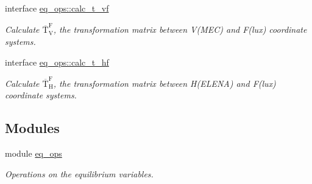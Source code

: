 \begin{DoxyCompactItemize}
interface \hyperlink{interfaceeq__ops_1_1calc__t__vf}{eq\+\_\+ops\+::calc\+\_\+t\+\_\+vf}
\begin{DoxyCompactList}\small\item\em Calculate $\overline{\text{T}}_\text{V}^\text{F}$, the transformation matrix between V(\+M\+E\+C) and F(lux) coordinate systems. \end{DoxyCompactList}\item 
interface \hyperlink{interfaceeq__ops_1_1calc__t__hf}{eq\+\_\+ops\+::calc\+\_\+t\+\_\+hf}
\begin{DoxyCompactList}\small\item\em Calculate $\overline{\text{T}}_\text{H}^\text{F}$, the transformation matrix between H(\+E\+L\+E\+N\+A) and F(lux) coordinate systems. \end{DoxyCompactList}\end{DoxyCompactItemize}
\subsection*{Modules}
\begin{DoxyCompactItemize}
\item 
module \hyperlink{namespaceeq__ops}{eq\+\_\+ops}
\begin{DoxyCompactList}\small\item\em Operations on the equilibrium variables. \end{DoxyCompactList}\end{DoxyCompactItemize}
